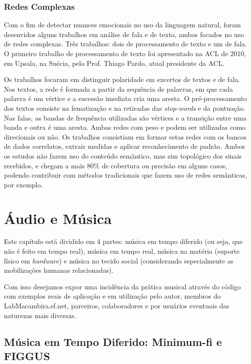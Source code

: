 \subsubsection{Redes Complexas}
Com o fim de detectar nuances emocionais no uso da linguagem natural, foram desenvidos alguns trabalhos em análise de fala e de texto, ambos focados no uso de redes complexas. Três trabalhos: dois de processamento de texto e um de fala. O primeiro trabalho de processamento de texto foi apresentado na ACL de 2010, em Upsala, na Suécia, pelo Prof. Thiago Pardo, atual presidente da ACL.\cite{FabbriACL,FabbriComplenetVoz,FabbriComplenetTexto}

Os trabalhos focaram em distinguir polaridade em excertos de textos e de fala. Nos textos, a rede é formada a partir da sequência de palavras, em que cada palavra é um vértice e a sucessão imediata cria uma aresta. O pré-processamento dos textos consiste na lematização e na retiradas das \emph{stop-words} e da pontuação. Nas falas, as bandas de frequência utilizadas são vértices e a transição entre uma banda e outra é uma aresta. Ambas redes com peso e podem ser utilizadas como direcionais ou não. Os trabalhos consistiam em formar estas redes com os bancos de dados correlatos, extrair medidas e aplicar reconhecimento de padrão. Ambos os estudos não fazem uso do conteúdo semântico, mas sim topológico dos sinais recebidos, e chegam a mais 80\% de cobertura ou precisão em alguns casos, podendo contribuir com métodos tradicionais que fazem uso de redes semânticas, por exemplo.

\section{Áudio e Música}

Este capítulo está dividido em 4 partes: música em
tempo diferido (ou seja, que não é feito em tempo real), música em
tempo real, música na matéria (suporte físico em \emph{hardware}) e música no
tecido social (considerando especialmente as mobilizações humanas
relacionadas).

Com isso desejamos expor uma incidência da prática musical através do código com
exemplos reais de aplicação e em utilização pelo autor, membros do
LabMacambira.sf.net, parceiros, colaboradores e por usuários
eventuais das naturezas mais diversas.


\subsection{Música em Tempo Diferido: Minimum-fi e FIGGUS}


